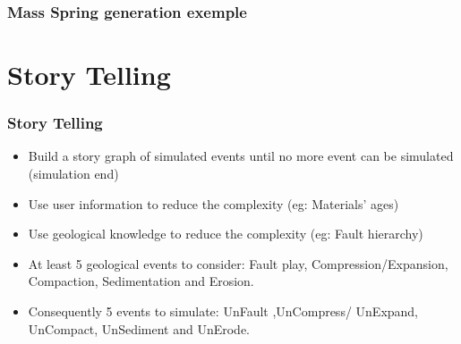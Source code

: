 \documentclass{beamer}
\begin{document}
    
    \begin{frame} 
    \frametitle{Mass Spring generation exemple}
    \end{frame} 



	\section{Story Telling}	
	
	\begin{frame}
	\frametitle{Story Telling}
	\begin{itemize}
	\item Build a story graph of simulated events until no more event can be simulated (simulation end)
	\item Use user information to reduce the complexity (eg: Materials' ages)
	\item Use geological knowledge to reduce the complexity (eg: Fault hierarchy)
	\item At least 5 geological events to consider: Fault play, Compression/Expansion, Compaction, Sedimentation and Erosion.
	\item Consequently 5 events to simulate: UnFault ,UnCompress/ UnExpand, UnCompact, UnSediment and UnErode.
    \end{itemize}
	\end{frame}
	
\end{document}
